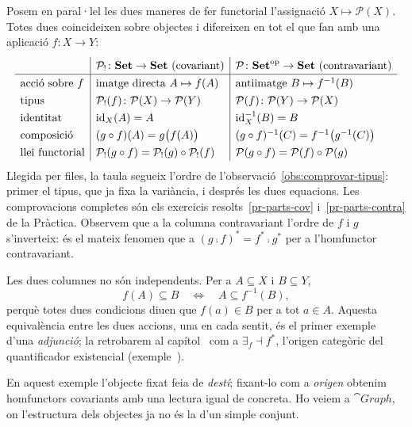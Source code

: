 \begin{exemple}\label{ex:parts-dues-variancies}
Posem en paral·lel les dues maneres de fer functorial l'assignació $X\mapsto\mathcal P(X)$. Totes dues coincideixen sobre objectes i difereixen en tot el que fan amb una aplicació $f\colon X\to Y$:
\[
\renewcommand{\arraystretch}{1.3}
\begin{array}{l|l|l}
 & \mathcal P_!\colon\cat{Set}\to\cat{Set}\ \text{(covariant)} & \mathcal P\colon\cat{Set}\op\to\cat{Set}\ \text{(contravariant)}\\ \hline
\text{acció sobre } f & \text{imatge directa } A\mapsto f(A) & \text{antiimatge } B\mapsto f^{-1}(B)\\
\text{tipus} & \mathcal P_!(f)\colon\mathcal P(X)\to\mathcal P(Y) & \mathcal P(f)\colon\mathcal P(Y)\to\mathcal P(X)\\
\text{identitat} & \id_X(A)=A & \id_X^{-1}(B)=B\\
\text{composició} & (g\comp f)(A)=g\bigl(f(A)\bigr) & (g\comp f)^{-1}(C)=f^{-1}\bigl(g^{-1}(C)\bigr)\\
\text{llei functorial} & \mathcal P_!(g\comp f)=\mathcal P_!(g)\comp\mathcal P_!(f) & \mathcal P(g\comp f)=\mathcal P(f)\comp\mathcal P(g)
\end{array}
\]
Llegida per files, la taula segueix l'ordre de l'observació~\ref{obs:comprovar-tipus}: primer el tipus, que ja fixa la variància, i després les dues equacions. Les comprovacions completes són els exercicis resolts~\ref{pr-parts-cov} i~\ref{pr-parts-contra} de la Pràctica. Observem que a la columna contravariant l'ordre de $f$ i $g$ s'inverteix: és el mateix fenomen que a $(g\comp f)^*=f^*\comp g^*$ per a l'homfunctor contravariant.

Les dues columnes no són independents. Per a $A\subseteq X$ i $B\subseteq Y$,
\[
f(A)\subseteq B\quad\Longleftrightarrow\quad A\subseteq f^{-1}(B),
\]
perquè totes dues condicions diuen que $f(a)\in B$ per a tot $a\in A$. Aquesta equivalència entre les dues accions, una en cada sentit, és el primer exemple d'una \emph{adjunció}; la retrobarem al capítol~ com a $\exists_f\dashv f^{*}$, l'origen categòric del quantificador existencial (exemple~).
\end{exemple}

En aquest exemple l'objecte fixat feia de \emph{destí}; fixant-lo com a \emph{origen} obtenim homfunctors covariants amb una lectura igual de concreta. Ho veiem a $\cat{Graph}$, on l'estructura dels objectes ja no és la d'un simple conjunt.

